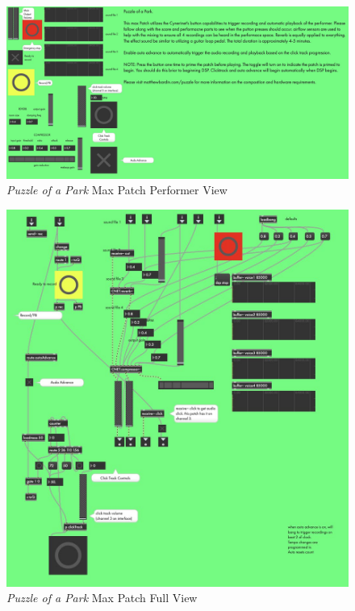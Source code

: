 \begin{figure}
    \centering
    \includegraphics[scale=0.2]{diagrams/maxPatches/puzzlePresentation.jpg}
    \caption{\textit{Puzzle of a Park} Max Patch Performer View}
    \label{fig:puzzlePatchPres}
\end{figure}

\begin{figure}
    \centering
    \includegraphics[scale=0.25]{diagrams/maxPatches/puzzleRaw.jpg}
    \caption{\textit{Puzzle of a Park} Max Patch Full View}
    \label{fig:puzzlePatchRaw}
\end{figure}

